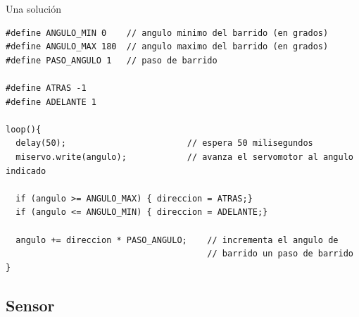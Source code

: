 \begin{frame}[fragile]{Una solución}
  \begin{lstlisting}
#define ANGULO_MIN 0    // angulo minimo del barrido (en grados)
#define ANGULO_MAX 180  // angulo maximo del barrido (en grados)
#define PASO_ANGULO 1   // paso de barrido 

#define ATRAS -1
#define ADELANTE 1

loop(){
  delay(50);                        // espera 50 milisegundos
  miservo.write(angulo);            // avanza el servomotor al angulo indicado

  if (angulo >= ANGULO_MAX) { direccion = ATRAS;}
  if (angulo <= ANGULO_MIN) { direccion = ADELANTE;}

  angulo += direccion * PASO_ANGULO;    // incrementa el angulo de 
                                        // barrido un paso de barrido
} 
\end{lstlisting}




\end{frame}

\subsection{Sensor}

